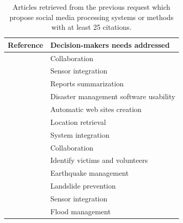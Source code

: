 \begin{table}[hbp]
    \centering
    \renewcommand{\arraystretch}{1.5}
    \caption{Articles retrieved from the previous request which propose social media processing systems or methods with at least 25 citations.}
    \begin{tabular}{m{} m{}}
        Reference                                               & Decision-makers needs addressed        \\ [0.5ex]
        \toprule
        \cite{benabenMetamodelItsOntology2008b}                 & Collaboration                          \\
        \cite{babitskiOntologybasedIntegrationSensor2009}       & Sensor integration                     \\
        \cite{liOntologyenrichedMultiDocumentSummarization2010} & Reports summarization                  \\
        \cite{babitskiSoKNOSUsingSemantic2011}                  & Disaster management software usability \\
        \cite{chouOntologyDevelopingWeb2011}                    & Automatic web sites creation           \\
        \cite{ghahremanlouGeotaggingTwitterMessages2014}        & Location retrieval                     \\
        \cite{madniSystemsIntegrationKey2014}                   & System integration                     \\
        \cite{othmanDevelopmentValidationDisaster2014}          & Collaboration                          \\
        \cite{purohitIdentifyingSeekersSuppliers2014}           & Identify victims and volunteers        \\
        \cite{xuModelingRepresentationEarthquake2014}           & Earthquake management                  \\
        \cite{jungOntologydrivenSlopeModeling2015}              & Landslide prevention                   \\
        \cite{posladSemanticIoTEarly2015}                       & Sensor integration                     \\
        \cite{qiuIntegratedFloodManagement2017}                 & Flood management                       \\
        \bottomrule
    \end{tabular}
    \label{table:situation-models-main-articles}
\end{table}

